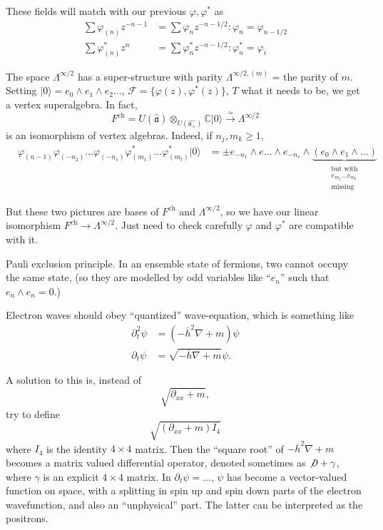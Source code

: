 \begin{exercise}
\label{exercise-relations-for-these-fields}
These fields will match with our previous
$\varphi,\varphi^*$ as
\begin{align*}
\sum \varphi_{(n)}z^{-n-1}&=\sum \varphi_n z^{-n-1/2} 
: \varphi_n=\varphi_{n-1/2}\\
\sum \varphi_{(n)}^*z^n&=\sum \varphi_n^* z^{-n-1/2}
: \varphi_n^*=\varphi_i
\end{align*}
\end{exercise}

\medskip\noindent
The space $\Lambda^{\infty/2}$ has a super-structure
with parity $\Lambda^{\infty/2,(m)}$ = the parity of $m$.
Setting
$|0\rangle=e_0 \wedge e_1 \wedge e_2 \ldots$,
$\mathcal{F}=\{\varphi(z),\varphi^*(z)\}$,
$T$ what it needs to be,
we get a vertex superalgebra.
In fact,
$$
F^{\text{ch}}=U(\hat{\mathfrak{a}})\otimes_{U(\hat{\mathfrak{a}_+})}
\mathbb{C}|0\rangle
\xrightarrow{\simeq}\Lambda^{\infty/2}
$$
is an isomorphism of vertex algebras.
Indeed, if $n_j,m_k \geq 1$,
\begin{align*}
&\varphi_{(n-1)}\varphi_{(-n_2)}\ldots\varphi_{(-n_s)}
\varphi^*_{(m_1)}\ldots \varphi^*_{(m_t)}|0\rangle
&=\pm e_{-n_1}\wedge e\ldots \wedge e_{-n_s}
\wedge \underbrace{(e_0 \wedge e_1 \wedge \ldots)
}_{\substack{\text{but with} \\ e_{m_1}\ldots e_{m_t}\\
\text{missing}}}
\end{align*}

\noindent
But these two pictures are bases of $F^{\text{ch}}$ and $\Lambda^{\infty/2}$,
so we have our linear isomorphism
$F^{\text{ch}} \to \Lambda^{\infty/2}$.
Just need to check carefully $\varphi$ and $\varphi^*$ 
are compatible with it.

\medskip\noindent
Pauli exclusion principle. In an ensemble
state of fermions,
two cannot occupy the same state,
(so they are modelled by odd variables
like ``$e_n$'' such that $e_n \wedge e_n=0$.)

Electron waves should obey 
``quantized'' wave-equation,
which is something like
\begin{align*}
\partial_t^2 \psi&=(- \overline{h}^2 \nabla+m)\psi\\
\partial_t \psi&=\sqrt{-\overline{h}\nabla+m}\psi.
\end{align*}

\noindent
A solution to this is, instead of
$$
\sqrt{\partial_{x x}+m},
$$
try to define
$$
\sqrt{(\partial_{x x}+m)I_4}
$$
where $I_4$ is the identity $4 \times 4 $ matrix.
Then the ``square root'' of $-\overline{h}^2 \nabla +m$
becomes a matrix valued differential operator,
denoted sometimes as $\not \partial + \gamma$,
where $\gamma$ is an explicit $4 \times 4$ matrix.
In $\partial_t \psi=\ldots$, $\psi$ has become
a vector-valued function on space,
with a splitting in spin up and spin down parts
of the electron wavefunction, and also an
``unphysical'' part. The latter
can be interpreted as the positrons.

